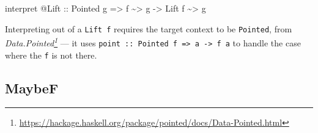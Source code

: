 \documentclass[]{article}
\newenvironment{Shaded}{}{}
\newcommand{\DataTypeTok}[1]{\textcolor[rgb]{0.56,0.13,0.00}{#1}}
\newcommand{\NormalTok}[1]{#1}
\newcommand{\OperatorTok}[1]{\textcolor[rgb]{0.40,0.40,0.40}{#1}}
\newcommand{\OtherTok}[1]{\textcolor[rgb]{0.00,0.44,0.13}{#1}}
\renewcommand{\href}[2]{#2\footnote{\url{#1}}}
\begin{document}
\begin{itemize}
\begin{Shaded}
\begin{Highlighting}[]
\NormalTok{interpret }\OperatorTok{@}\DataTypeTok{Lift}
\OtherTok{    ::} \DataTypeTok{Pointed}\NormalTok{ g}
    \OtherTok{=>}\NormalTok{ f }\OperatorTok{\textasciitilde{}>}\NormalTok{ g}
    \OtherTok{{-}>} \DataTypeTok{Lift}\NormalTok{ f }\OperatorTok{\textasciitilde{}>}\NormalTok{ g}
\end{Highlighting}
\end{Shaded}

  Interpreting out of a \texttt{Lift\ f} requires the target context to be
  \texttt{Pointed}, from
  \emph{\href{https://hackage.haskell.org/package/pointed/docs/Data-Pointed.html}{Data.Pointed}}
  --- it uses
  \texttt{point\ ::\ Pointed\ f\ =\textgreater{}\ a\ -\textgreater{}\ f\ a} to
  handle the case where the \texttt{f} is not there.
\end{itemize}

\hypertarget{maybef}{%
\subsection{MaybeF}\label{maybef}}
\end{document}
